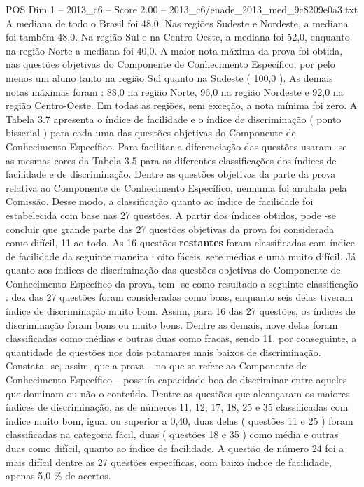 \begin{textsample}{POS Dim 1 – 2013\_c6 – Score 2.00 – 2013\_c6/enade\_2013\_med\_9c8209e0a3.txt}
A mediana de todo o Brasil foi 48,0.
Nas regiões Sudeste e Nordeste, a mediana foi também 48,0.
Na região Sul e na Centro-Oeste, a mediana foi 52,0, enquanto na região Norte a mediana foi 40,0.
A maior nota máxima da prova foi obtida, nas questões objetivas do Componente de Conhecimento Específico, por pelo menos um aluno tanto na região Sul quanto na Sudeste ( 100,0 ).
As demais notas máximas foram : 88,0 na região Norte, 96,0 na região Nordeste e 92,0 na região Centro-Oeste.
Em todas as regiões, sem exceção, a nota mínima foi zero.
A Tabela 3.7 apresenta o índice de facilidade e o índice de discriminação ( ponto bisserial ) para cada uma das questões objetivas do Componente de Conhecimento Específico.
Para facilitar a diferenciação das questões usaram -se as mesmas cores da Tabela 3.5 para as diferentes classificações dos índices de facilidade e de discriminação.
Dentre as questões objetivas da parte da prova relativa ao Componente de Conhecimento Específico, nenhuma foi anulada pela Comissão.
Desse modo, a classificação quanto ao índice de facilidade foi estabelecida com base nas 27 questões.
A partir dos índices obtidos, pode -se concluir que grande parte das 27 questões objetivas da prova foi considerada como difícil, 11 ao todo.
As 16 questões \textbf{restantes} foram classificadas com índice de facilidade da seguinte maneira : oito fáceis, sete médias e uma muito difícil.
Já quanto aos índices de discriminação das questões objetivas do Componente de Conhecimento Específico da prova, tem -se como resultado a seguinte classificação : dez das 27 questões foram consideradas como boas, enquanto seis delas tiveram índice de discriminação muito bom.
Assim, para 16 das 27 questões, os índices de discriminação foram bons ou muito bons.
Dentre as demais, nove delas foram classificadas como médias e outras duas como fracas, sendo 11, por conseguinte, a quantidade de questões nos dois patamares mais baixos de discriminação.
Constata -se, assim, que a prova – no que se refere ao Componente de Conhecimento Específico – possuía capacidade boa de discriminar entre aqueles que dominam ou não o conteúdo.
Dentre as questões que alcançaram os maiores índices de discriminação, as de números 11, 12, 17, 18, 25 e 35 classificadas com índice muito bom, igual ou superior a 0,40, duas delas ( questões 11 e 25 ) foram classificadas na categoria fácil, duas ( questões 18 e 35 ) como média e outras duas como difícil, quanto ao índice de facilidade.
A questão de número 24 foi a mais difícil dentre as 27 questões específicas, com baixo índice de facilidade, apenas 5,0 \% de acertos.

\end{textsample}
